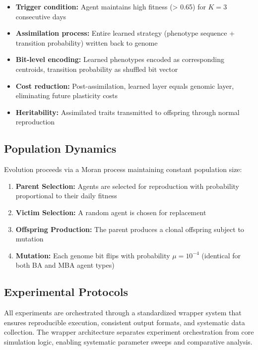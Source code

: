 \documentclass[aps,pre,twocolumn,floatfix,nofootinbib,amsmath,amssymb]{revtex4-2}
\begin{document}
\begin{itemize}
\item \textbf{Trigger condition:} Agent maintains high fitness (> 0.65) for $K = 3$ consecutive days
\item \textbf{Assimilation process:} Entire learned strategy (phenotype sequence + transition probability) written back to genome
\item \textbf{Bit-level encoding:} Learned phenotypes encoded as corresponding centroids, transition probability as shuffled bit vector
\item \textbf{Cost reduction:} Post-assimilation, learned layer equals genomic layer, eliminating future plasticity costs
\item \textbf{Heritability:} Assimilated traits transmitted to offspring through normal reproduction
\end{itemize}

\subsection{Population Dynamics}

Evolution proceeds via a Moran process maintaining constant population size:

\begin{enumerate}
\item \textbf{Parent Selection:} Agents are selected for reproduction with probability proportional to their daily fitness
\item \textbf{Victim Selection:} A random agent is chosen for replacement
\item \textbf{Offspring Production:} The parent produces a clonal offspring subject to mutation
\item \textbf{Mutation:} Each genome bit flips with probability $\mu = 10^{-4}$ (identical for both BA and MBA agent types)
\end{enumerate}

\subsection{Experimental Protocols}

All experiments are orchestrated through a standardized wrapper system that ensures reproducible execution, consistent output formats, and systematic data collection. The wrapper architecture separates experiment orchestration from core simulation logic, enabling systematic parameter sweeps and comparative analysis.
\end{document}
